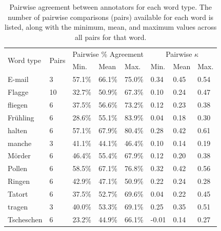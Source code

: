 		\begin{table}%
			\centering
			\caption[Pairwise agreement statistics by word type]{Pairwise agreement between annotators for each word type.  The number of pairwise comparisons (pairs) available for each word is listed, along with the minimum, mean, and maximum values across all pairs for that word.}
			
			\begin{tabularx}{\textwidth}{lXXXXXXX}			
			\toprule		

\multirow{2}{*}{Word type}	&	\multirow{2}{*}{Pairs}	&	\multicolumn{3}{c}{Pairwise \% Agreement}					&	\multicolumn{3}{c}{Pairwise $\kappa$}					\\
				\cmidrule(lr){3-5}						\cmidrule(lr){6-8}					
	&		&	Min.	&	Mean	&	Max.	&	Min.	&	Mean	&	Max.	\\
\midrule															
E-mail	&	3	&	57.1\%	&	66.1\%	&	75.0\%	&	0.34	&	0.45	&	0.54	\\
Flagge	&	10	&	32.7\%	&	50.9\%	&	67.3\%	&	0.10	&	0.24	&	0.47	\\
fliegen	&	6	&	37.5\%	&	56.6\%	&	73.2\%	&	0.12	&	0.23	&	0.38	\\
Frühling	&	6	&	28.6\%	&	55.1\%	&	83.9\%	&	0.04	&	0.18	&	0.30	\\
halten	&	6	&	57.1\%	&	67.9\%	&	80.4\%	&	0.28	&	0.42	&	0.61	\\
manche	&	3	&	41.1\%	&	44.1\%	&	46.4\%	&	0.10	&	0.14	&	0.19	\\
Mörder	&	6	&	46.4\%	&	55.4\%	&	67.9\%	&	0.12	&	0.20	&	0.38	\\
Pollen	&	6	&	58.5\%	&	67.1\%	&	76.8\%	&	0.32	&	0.42	&	0.56	\\
Ringen	&	6	&	42.9\%	&	47.1\%	&	50.9\%	&	0.22	&	0.24	&	0.28	\\
Tatort	&	6	&	37.5\%	&	52.7\%	&	69.6\%	&	0.04	&	0.22	&	0.45	\\
tragen	&	3	&	40.0\%	&	53.3\%	&	69.1\%	&	0.25	&	0.35	&	0.51	\\
Tscheschen	&	6	&	23.2\%	&	44.9\%	&	66.1\%	&	-0.01	&	0.14	&	0.27	\\		

			\bottomrule
			\end{tabularx}
			
			\label{tab:agreement:annotators}
		\end{table}
		
